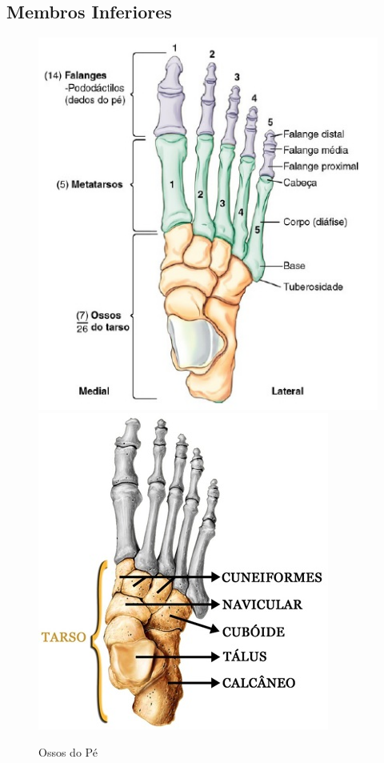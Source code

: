 \documentclass[
]{book}
\begin{document}
\hypertarget{membros-inferiores}{%
\subsection{Membros Inferiores}\label{membros-inferiores}}

\begin{figure}

{\centering \includegraphics[width=0.5\linewidth]{figuras/Aula4-3a-ossos-do-pe} \includegraphics[width=0.5\linewidth]{figuras/Aula4-3b-ossos-do-pe} 

}

\caption{Ossos do Pé}\label{fig:unnamed-chunk-6}
\end{figure}
\end{document}
